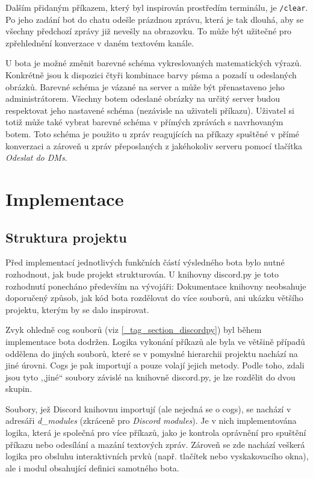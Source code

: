 \documentclass[FM]{tulthesis}
\begin{document}
	Dalším přidaným příkazem, který byl inspirován prostředím terminálu, je \verb*|/clear|. Po jeho zadání bot do chatu odešle  prázdnou zprávu, která je tak dlouhá, aby se všechny předchozí zprávy již nevešly na obrazovku. To může být užitečné pro zpřehlednění konverzace v daném textovém kanále.
	
	U bota je možné změnit barevné schéma vykreslovaných matematických výrazů. Konkrétně jsou k dispozici čtyři kombinace barvy písma a pozadí u odeslaných obrázků. Barevné schéma je vázané na server a může být přenastaveno jeho administrátorem. Všechny botem odeslané obrázky na určitý server budou respektovat jeho nastavené schéma (nezávisle na uživateli příkazu). Uživatel si totiž může také vybrat barevné schéma v přímých zprávách s navrhovaným botem. Toto schéma je použito u zpráv reagujících na příkazy spuštěné v přímé konverzaci a zároveň u zpráv přeposlaných z jakéhokoliv serveru pomocí tlačítka \textit{Odeslat do DMs}.
	
	\section{Implementace}
	
	\subsection{Struktura projektu}

	Před implementací jednotlivých funkčních částí výsledného bota bylo nutné rozhodnout, jak bude projekt strukturován. U knihovny discord.py je toto rozhodnutí ponecháno především na vývojáři: Dokumentace knihovny neobsahuje doporučený způsob, jak kód bota rozdělovat do více souborů, ani ukázku většího projektu, kterým by se dalo inspirovat.
	
	Zvyk ohledně cog souborů (viz \ref{_tag_section_discordpy}) byl během implementace bota dodržen. Logika vykonání příkazů ale byla ve většině případů oddělena do jiných souborů, které se v pomyslné hierarchii projektu nachází na jiné úrovni. Cogs je pak importují a pouze volají jejich metody. Podle toho, zdali jsou tyto ,,jiné`` soubory závislé na knihovně discord.py, je lze rozdělit do dvou skupin.
	
	Soubory, jež Discord knihovnu importují (ale nejedná se o cogs), se nachází v adresáři \textit{d\_modules} (zkráceně pro \textit{Discord modules}). Je v nich implementována logika, která je společná pro více příkazů, jako je kontrola oprávnění pro spuštění příkazu nebo odesílání a mazání textových zpráv. Zároveň se zde nachází veškerá logika pro obsluhu interaktivních prvků (např. tlačítek nebo vyskakovacího okna), ale i modul obsahující definici samotného bota.
	
\end{document}
